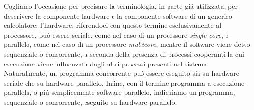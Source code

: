 Cogliamo l'occasione per precisare la terminologia, in parte gi\'a utilizzata, per descrivere la componente hardware e la componente software di un generico calcolatore: l'hardware, riferendoci con questo termine esclusivamente al processore, pu\'o essere seriale, come nel caso di un processore \textit{single core}, o parallelo, come nel caso di un processore \textit{multicore}, mentre il software viene detto sequenziale o concorrente, a seconda della presenza di processi cooperanti la cui esecuzione viene influenzata dagli altri processi presenti nel sistema.\newline
Naturalmente, un programma concorrente pu\'o essere eseguito sia su hardware seriale che su hardware parallelo.\newline
Infine, con il termine programma a esecuzione parallela, o pi\'u semplicemente software parallelo, indichiamo un programma, sequenziale o concorrente, eseguito su hardware parallelo.